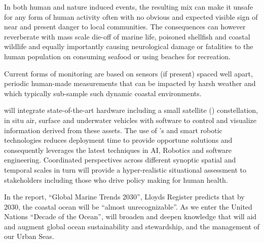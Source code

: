 \documentclass[12pt]{article}
\begin{document}
In both human and nature induced events, the resulting mix can make it
unsafe for any form of human activity often with no obvious and
expected visible sign of near and present danger to local communities.
The consequences can however reverberate with mass scale die-off of
marine life, poisoned shellfish and coastal wildlife and equally
importantly causing neurological damage or fatalities to the human
population on consuming seafood or using beaches for recreation.

Current forms of monitoring are based on sensors (if present) spaced
well apart, periodic human-made measurements that can be impacted by
harsh weather and which typically sub-sample such dynamic coastal
environments.

\pro will integrate state-of-the-art hardware including a small
satellite (\smle) constellation, in situ air, surface and underwater
vehicles with software to control and visualize information derived
from these assets.  The use of \smle's and smart robotic technologies
reduces deployment time to provide opportune solutions and
consequently leverages the latest techniques in AI, Robotics and
software engineering. Coordinated perspectives across different
synoptic spatial and temporal scales in turn will provide a
hyper-realistic situational assessment to stakeholders including those
who drive policy making for human health.

In the report, “Global Marine Trends 2030”, Lloyds Register predicts
that by 2030, the coastal ocean will be “almost unrecognizable”. As we
enter the United Nations “Decade of the Ocean”, \pro will broaden and
deepen knowledge that will aid and augment global ocean sustainability
and stewardship, and the management of our Urban Seas.






\end{document}
